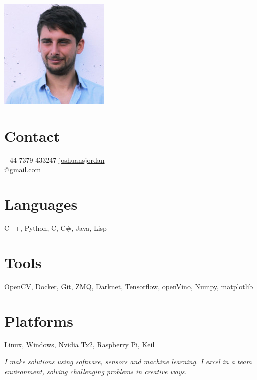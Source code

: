 \documentclass[print]{friggeri-cv} %
\begin{document}

\begin{aside} %
\includegraphics[width=0.6\columnwidth]{0.jpg} %
\section{Contact}
+44 7379 433247
\href{mailto:joshuansjordan@gmail.com}{joshuansjordan\\@gmail.com}
\section{Languages}
C++, Python, C, C\#, Java, Lisp
\section{Tools}
OpenCV, Docker, Git, ZMQ, Darknet, Tensorflow, openVino, Numpy, matplotlib
\section{Platforms}
Linux, Windows, Nvidia Tx2, Raspberry Pi, Keil
\end{aside}

\emph{I make solutions using software, sensors and machine learning. I excel in a team environment, solving challenging problems in creative ways.}
\end{document}
